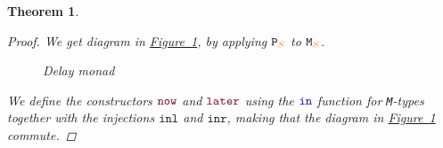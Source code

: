 \documentclass[twoside,11pt,openright]{report}
\theoremstyle{plain} %
\newtheorem{thm}{Theorem}[section]
\theoremstyle{definition}
\theoremstyle{remark}
\newcommand*{\figref}[1]{\hyperref[fig:#1]{Figure~\ref*{fig:#1}}}
\newcommand*{\type}[1]{\textcolor{magenta!90!black}{#1}}
\newcommand*{\container}[1]{\textcolor{orange}{#1}}
\newcommand*{\function}[1]{\textcolor{blue!60!black}{\ensuremath{\mathtt{#1}}}}
\newcommand*{\constructor}[1]{\textcolor{purple!60!black}{\ensuremath{\mathtt{#1}}}}
\newcommand*{\typeformer}[1]{\ensuremath{\mathtt{#1}}}
\newcommand*{\functor}[1]{\ensuremath{\mathbf{\mathtt{#1}}}}
\begin{document}
\begin{thm}
\begin{proof}
    We get diagram in \figref{delay-monad}, by applying \(\functor{P}_{\container{S}}\) to \(\typeformer{M}_{\container{S}}\).
    \begin{figure}[h]
      \centering
      \caption{Delay monad}
      \label{fig:delay-monad}
    \end{figure}
    \noindent We define the constructors \(\constructor{now}\) and \(\constructor{later}\) using the \(\function{in}\) function for \texttt{M}-types together with the injections \(\mathtt{inl}\) and \(\mathtt{inr}\), making that the diagram in \figref{delay-monad} commute.
  \end{proof}
\end{thm}
\end{document}
